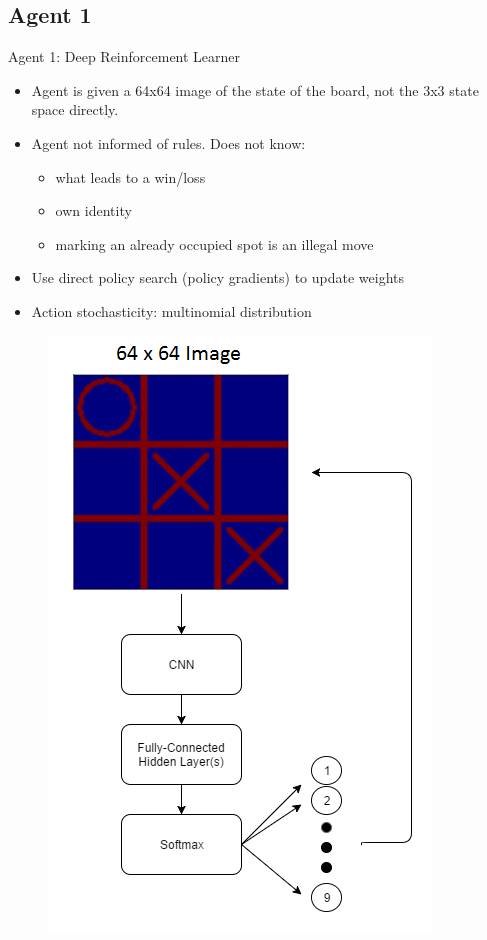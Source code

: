 \documentclass[11pt]{beamer}
\begin{document}
\subsection{Agent 1}
\begin{frame}{Agent 1: Deep Reinforcement Learner}
	\begin{minipage}[t]{0.55\linewidth}
		\begin{itemize}
			\item Agent is given a 64x64 image of the state of the board, not the 3x3 state space directly.
			\item Agent not informed of rules. Does not know:
				\begin{itemize}
					\item what leads to a win/loss
					\item own identity
					\item marking an already occupied spot is an illegal move
				\end{itemize}
			\item Use direct policy search (policy gradients) to update weights
			\item Action stochasticity: multinomial distribution
		\end{itemize}
	\end{minipage}
	\hfill
	\begin{minipage}[t]{0.4\linewidth}
		\centering
		\begin{figure}[tttDL]
			\centering
			\includegraphics[width=.95\textwidth]{Figures/deeptictactoe.png}

\end{figure}
\end{minipage}
\end{frame}
\end{document}
